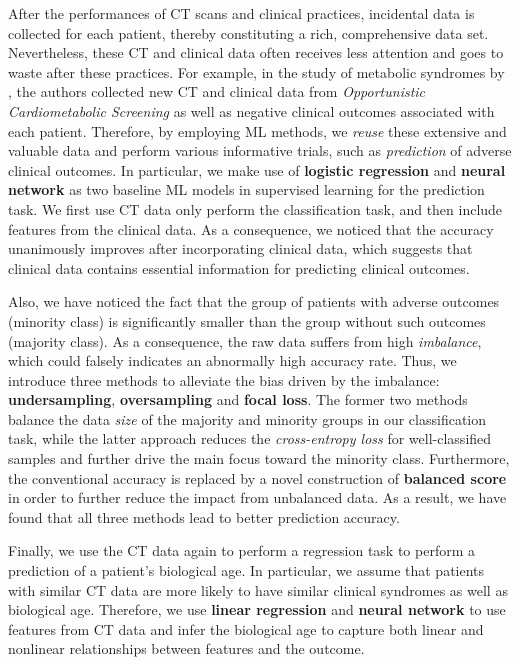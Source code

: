 \documentclass{article}
\begin{document}
After the performances of CT scans and clinical practices, incidental data is collected for each patient, thereby constituting a rich, comprehensive data set. Nevertheless, these CT and clinical data often receives less attention and goes to waste after these practices. For example, in the study of metabolic syndromes by \cite{pickhardt2020opportunistic}, the authors collected new CT and clinical data from \textit{Opportunistic Cardiometabolic Screening} as well as negative clinical outcomes associated with each patient. Therefore, by employing ML methods, we \textit{reuse} these extensive and valuable data and perform various informative trials, such as \textit{prediction} of adverse clinical outcomes. In particular, we make use of \textbf{logistic regression} and \textbf{neural network} as two baseline ML models in supervised learning for the prediction task. We first use CT data only perform the classification task, and then include features from the clinical data. As a consequence, we noticed that the accuracy unanimously improves after incorporating clinical data, which suggests that clinical data contains essential information for predicting clinical outcomes. 

Also, we have noticed the fact that the group of patients with adverse outcomes (minority class) is significantly smaller than the group without such outcomes (majority class). As a consequence, the raw data suffers from high \textit{imbalance}, which could falsely indicates an abnormally high accuracy rate. Thus, we introduce three methods to alleviate the bias driven by the imbalance: \textbf{undersampling}, \textbf{oversampling} and \textbf{focal loss}. The former two methods balance the data \textit{size} of the majority and minority groups in our classification task, while the latter approach reduces the \textit{cross-entropy loss} for well-classified samples and further drive the main focus toward the minority class. Furthermore, the conventional accuracy is replaced by a novel construction of \textbf{balanced score} in order to further reduce the impact from unbalanced data. As a result, we have found that all three methods lead to better prediction accuracy.  

Finally, we use the CT data again to perform a regression task to perform a prediction of a patient's biological age. In particular, we assume that patients with similar CT data are more likely to have similar clinical syndromes as well as biological age. Therefore, we use \textbf{linear regression} and \textbf{neural network} to use features from CT data and infer the biological age to capture both linear and nonlinear relationships between features and the outcome. 
\end{document}
